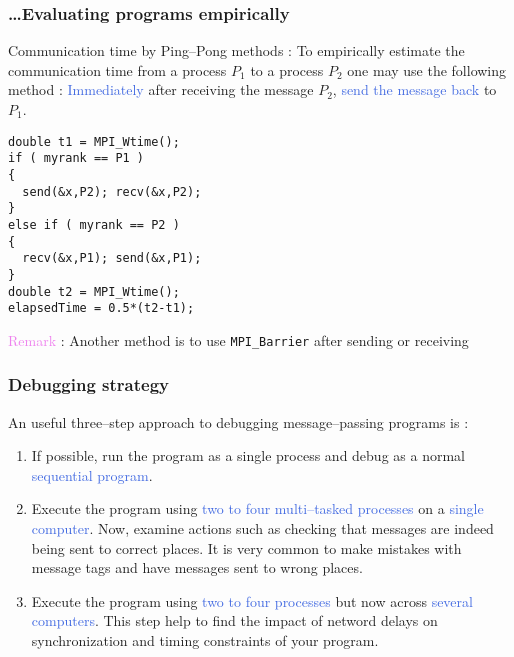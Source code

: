 \documentclass{beamer}
\begin{document}
\begin{frame}[fragile]
\frametitle{\ldots Evaluating programs empirically}
\small
\alert{Communication time by Ping--Pong methods} :
To empirically estimate the communication time
from a process $P_{1}$ to a process $P_{2}$ one may
use the following method : \textcolor{royalblue}{Immediately}
after receiving the message $P_{2}$, 
\textcolor{royalblue}{send the message back} to $P_{1}$.
\begin{lstlisting}
double t1 = MPI_Wtime();
if ( myrank == P1 )
{
  send(&x,P2); recv(&x,P2);
}
else if ( myrank == P2 )
{
  recv(&x,P1); send(&x,P1);
}
double t2 = MPI_Wtime();
elapsedTime = 0.5*(t2-t1);
\end{lstlisting}

\textcolor{violet}{Remark} : Another method is to use
\texttt{MPI\_Barrier} after sending or receiving
\end{frame}

\begin{frame}
\frametitle{Debugging strategy}
An useful \alert{three--step approach} to debugging
message--passing programs is :
\begin{enumerate}
\item If possible, run the program as a single process and debug
  as a normal \textcolor{royalblue}{sequential program}.
\item Execute the program using 
  \textcolor{royalblue}{two to four multi--tasked processes}
  on a \textcolor{royalblue}{single computer}. Now, examine
  actions such as checking that messages are indeed being
  sent to correct places. It is very common to make
  mistakes with message tags and have messages sent to wrong
  places.
\item Execute the program using \textcolor{royalblue}{two
    to four processes} but now across 
  \textcolor{royalblue}{several computers}. This step help to
  find the impact of netword delays on synchronization and timing
  constraints of your program.
\end{enumerate}
\end{frame}
\end{document}
